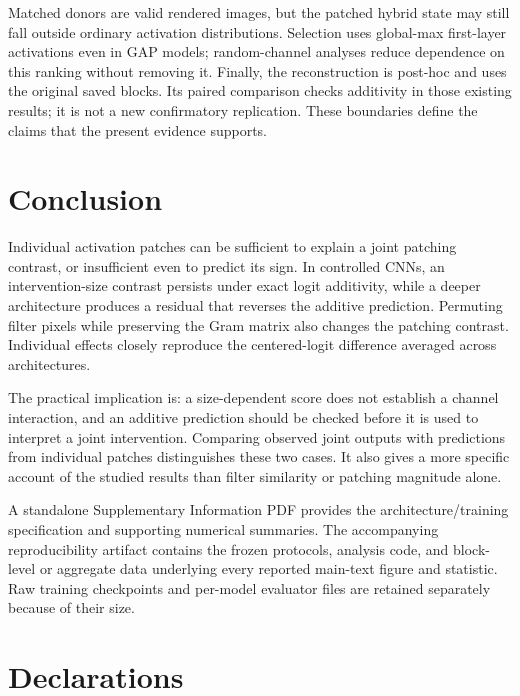 \documentclass[pdflatex,sn-basic]{sn-jnl}
\begin{document}
Matched donors are valid rendered images, but the patched hybrid state may still fall outside ordinary activation distributions. Selection uses global-max first-layer activations even in GAP models; random-channel analyses reduce dependence on this ranking without removing it. Finally, the reconstruction is post-hoc and uses the original saved blocks. Its paired comparison checks additivity in those existing results; it is not a new confirmatory replication. These boundaries define the claims that the present evidence supports.

\section{Conclusion}\label{sec:conclusion}

Individual activation patches can be sufficient to explain a joint patching contrast, or insufficient even to predict its sign. In controlled CNNs, an intervention-size contrast persists under exact logit additivity, while a deeper architecture produces a residual that reverses the additive prediction. Permuting filter pixels while preserving the Gram matrix also changes the patching contrast. Individual effects closely reproduce the centered-logit difference averaged across architectures.

The practical implication is: a size-dependent score does not establish a channel interaction, and an additive prediction should be checked before it is used to interpret a joint intervention. Comparing observed joint outputs with predictions from individual patches distinguishes these two cases. It also gives a more specific account of the studied results than filter similarity or patching magnitude alone.

\backmatter


A standalone Supplementary Information PDF provides the architecture/training specification and supporting numerical summaries. The accompanying reproducibility artifact contains the frozen protocols, analysis code, and block-level or aggregate data underlying every reported main-text figure and statistic. Raw training checkpoints and per-model evaluator files are retained separately because of their size.

\section*{Declarations}
\end{document}
